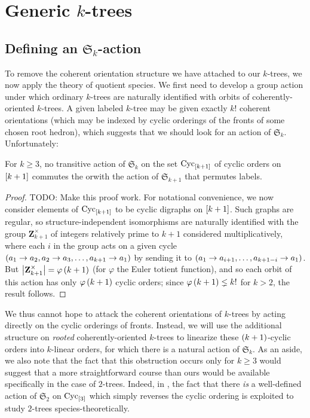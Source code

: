 \documentclass[sectionflow,singlespace,twoside,boldmathhdr]{brandiss} %
\numberwithin{section}{chapter}
\numberwithin{figure}{chapter}
\begin{document}
\section{Generic $k$-trees}
\subsection{Defining an $\mathfrak{S}_{k}$-action}\label{ss:saction}
To remove the coherent orientation structure we have attached to our $k$-trees, we now apply the theory of quotient species.
We first need to develop a group action under which ordinary $k$-trees are naturally identified with orbits of coherently-oriented $k$-trees.
A given labeled $k$-tree may be given exactly $k!$ coherent orientations (which may be indexed by cyclic orderings of the fronts of some chosen root hedron), which suggests that we should look for an action of $\mathfrak{S}_{k}$.
Unfortunately:
\begin{lemma}
  \label{lem:notransac}
  For $k \geq 3$, no transitive action of $\mathfrak{S}_{k}$ on the set $\operatorname{Cyc}_{\left[ {k+1} \right]}$ of cyclic orders on $\left[ {k+1} \right]$ commutes the orwith the action of $\mathfrak{S}_{k+1}$ that permutes labels.
\end{lemma}
\begin{proof}
  TODO: Make this proof work.
  For notational convenience, we now consider elements of $\operatorname{Cyc}_{\left[ {k+1} \right]}$ to be cyclic digraphs on $\left[ {k+1} \right]$.
  Such graphs are regular, so structure-independent isomorphisms are naturally identified with the group $\mathbf{Z}_{k+1}^{\times}$ of integers relatively prime to $k+1$ considered multiplicatively, where each $i$ in the group acts on a given cycle $\left( {a_{1} \to a_{2}, a_{2} \to a_{3}, \dots, a_{k+1} \to a_{1}} \right)$ by sending it to $\left( {a_{1} \to a_{i+1}, \dots, a_{k+1-i} \to a_{1}} \right)$.
  But $\left\vert {\mathbf{Z}_{k+1}^{\times}} \right\vert = \varphi \left( {k+1} \right)$ (for $\varphi$ the Euler totient function), and so each orbit of this action has only $\varphi \left( {k+1} \right)$ cyclic orders; since $\varphi \left( {k+1} \right) \lneq k!$ for $k > 2$, the result follows.
\end{proof}

We thus cannot hope to attack the coherent orientations of $k$-trees by acting directly on the cyclic orderings of fronts.
Instead, we will use the additional structure on \emph{rooted} coherently-oriented $k$-trees to linearize these $\left( {k+1} \right)$-cyclic orders into $k$-linear orders, for which there is a natural action of $\mathfrak{S}_{k}$.
As an aside, we also note that the fact that this obstruction occurs only for $k \geq 3$ would suggest that a more straightforward course than ours would be available specifically in the case of $2$-trees.
Indeed, in \cite{gessel:spec2trees}, the fact that there \emph{is} a well-defined action of $\mathfrak{S}_{2}$ on $\operatorname{Cyc}_{\left[ {3} \right]}$ which simply reverses the cyclic ordering is exploited to study $2$-trees species-theoretically.
\end{document}
